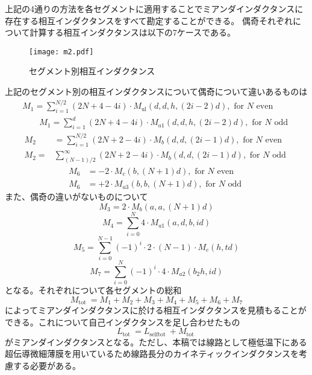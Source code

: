 上記の4通りの方法を各セグメントに適用することでミアンダインダクタンスに存在する相互インダクタンスをすべて勘定することができる。
偶奇それぞれについて計算する相互インダクタンスは以下の7ケースである。
\begin{figure}[H]
    \centering
    \texttt{[image: m2.pdf]}
    \caption{セグメント別相互インダクタンス}
\end{figure}
上記のセグメント別の相互インダクタンスについて偶奇について違いあるものは
\begin{equation}
    \begin{array}{l}
    M_{1}=\sum_{i=1}^{N / 2}(2 N+4-4 i) \cdot M_{\mathrm{ul}}(d, d, h,(2 i-2) d), \text { for } N \text { even } \\
    \qquad M_{1}=\sum_{i=1}^{d}(2 N+4-4 i) \cdot M_{a 1}(d, d, h,(2 i-2) d), \text { for } N \text { odd }
    \end{array}
\end{equation}
\begin{equation}
    \begin{aligned}
    M_{2} &=\sum_{i=1}^{N / 2}(2 N+2-4 i) \cdot M_{b}(d, d,(2 i-1) d), \text { for } N \text { even } \\
    M_{2}=&\sum_{(N-1) / 2}^{\infty}(2 N+2-4 i) \cdot M_{b}(d, d,(2 i-1) d), \text { for } N \text { odd }
    \end{aligned}
\end{equation}
\begin{equation}
    \begin{aligned}
    M_{6}&=-2 \cdot M_{c}(b,(N+1) d), \text { for } N \text { even }\\
    M_{6}&=+2 \cdot M_{a 3}(b, b,(N+1) d), \text { for } N \text { odd }
    \end{aligned}
\end{equation}
また、偶奇の違いがないものについて
\begin{equation}
    M_{3}=2 \cdot M_{b}(a, a,(N+1) d)
\end{equation}
\begin{equation}
    M_{4}=\sum_{i=0}^{N} 4 \cdot M_{a 1}(a, d, b, i d)
\end{equation}
\begin{equation}
    M_{5}=\sum_{i=0}^{N-1}(-1)^{i} \cdot 2 \cdot(N-1) \cdot M_{c}(h, t d)
\end{equation}
\begin{equation}
    M_{7}=\sum_{i=0}^{N}(-1)^{i} \cdot 4 \cdot M_{a 2}\left(b_{2} h, i d\right)
\end{equation}
となる。それぞれについて各セグメントの総和
\begin{equation}
    M_{\text {tot }}=M_{1}+M_{2}+M_{3}+M_{4}+M_{5}+M_{6}+M_{7}
\end{equation}
によってミアンダインダクタンスに於ける相互インダクタンスを見積もることができる。これについて自己インダクタンスを足し合わせたもの
\begin{equation}
    L_{\text {tot }}=L_{\text {selftot }}+M_{\text {tot }}
\end{equation}
がミアンダインダクタンスとなる。ただし、本稿では線路として極低温下にある超伝導微細薄膜を用いているため線路長分のカイネティックインダクタンスを考慮する必要がある。


